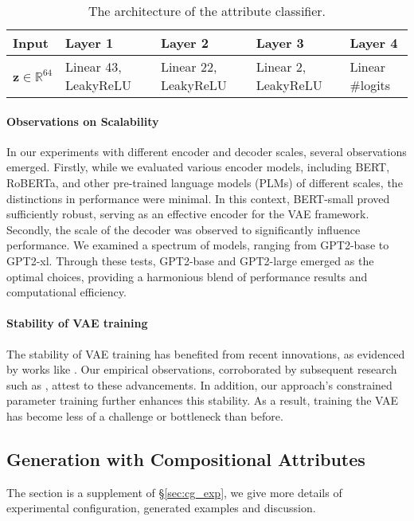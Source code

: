 \documentclass[11pt]{article}
\begin{document}
\begin{table}[ht]
    \centering
    \small
    \begin{tabular}{lllll}
        \toprule
        Input & Layer 1 & Layer 2 & Layer 3 & Layer 4\\\midrule
         $\bm z\in\mathbb{R}^{64}$&
         Linear 43, LeakyReLU&
         Linear 22, LeakyReLU&
         Linear 2, LeakyReLU&
         Linear \#logits\\\bottomrule
    \end{tabular}
    \caption{The architecture of the attribute classifier.}
    \label{tab:arc_classifier}
\end{table}
\paragraph{Observations on Scalability}
In our experiments with different encoder and decoder scales, several observations emerged. Firstly, while we evaluated various encoder models, including BERT, RoBERTa, and other pre-trained language models (PLMs) of different scales, the distinctions in performance were minimal. In this context, BERT-small proved sufficiently robust, serving as an effective encoder for the VAE framework. Secondly, the scale of the decoder was observed to significantly influence performance. We examined a spectrum of models, ranging from GPT2-base to GPT2-xl. Through these tests, GPT2-base and GPT2-large emerged as the optimal choices, providing a harmonious blend of performance results and computational efficiency.
\paragraph{Stability of VAE training}
The stability of VAE training has benefited from recent innovations, as evidenced by works like \citet{li-etal-2020-optimus}. Our empirical observations, corroborated by subsequent research such as \citet{hu2021causal}, attest to these advancements. In addition, our approach's constrained parameter training further enhances this stability. As a result, training the VAE has become less of a challenge or bottleneck than before.
\subsection{Generation with Compositional Attributes}
The section is a supplement of \S\ref{sec:cg_exp}, we give more details of experimental configuration, generated examples and discussion.
\end{document}
